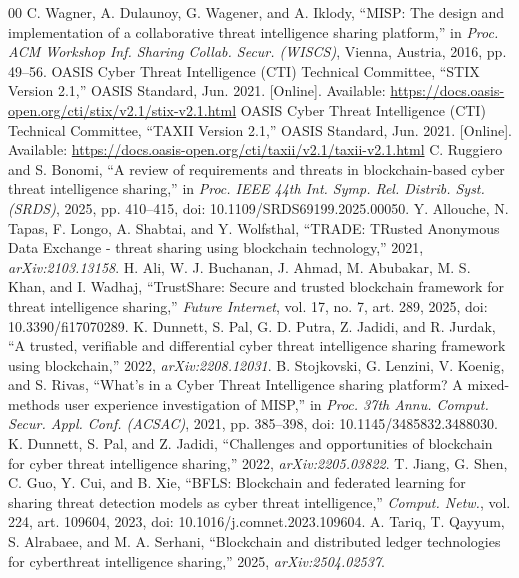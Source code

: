 \documentclass[conference]{IEEEtran}
\begin{document}
{\scriptsize\renewcommand{\baselinestretch}{0.80}\selectfont\setlength{\baselineskip}{6.4pt}
\begin{thebibliography}{00}
\setlength{\itemsep}{0pt plus 0.3pt}
 C. Wagner, A. Dulaunoy, G. Wagener, and A. Iklody, ``MISP: The design and implementation of a collaborative threat intelligence sharing platform,'' in \emph{Proc. ACM Workshop Inf. Sharing Collab. Secur. (WISCS)}, Vienna, Austria, 2016, pp. 49--56.
 OASIS Cyber Threat Intelligence (CTI) Technical Committee, ``STIX Version 2.1,'' OASIS Standard, Jun. 2021. [Online]. Available: \url{https://docs.oasis-open.org/cti/stix/v2.1/stix-v2.1.html}
 OASIS Cyber Threat Intelligence (CTI) Technical Committee, ``TAXII Version 2.1,'' OASIS Standard, Jun. 2021. [Online]. Available: \url{https://docs.oasis-open.org/cti/taxii/v2.1/taxii-v2.1.html}
 C. Ruggiero and S. Bonomi, ``A review of requirements and threats in blockchain-based cyber threat intelligence sharing,'' in \emph{Proc. IEEE 44th Int. Symp. Rel. Distrib. Syst. (SRDS)}, 2025, pp. 410--415, doi: 10.1109/SRDS69199.2025.00050.
 Y. Allouche, N. Tapas, F. Longo, A. Shabtai, and Y. Wolfsthal, ``TRADE: TRusted Anonymous Data Exchange - threat sharing using blockchain technology,'' 2021, \emph{arXiv:2103.13158}.
 H. Ali, W. J. Buchanan, J. Ahmad, M. Abubakar, M. S. Khan, and I. Wadhaj, ``TrustShare: Secure and trusted blockchain framework for threat intelligence sharing,'' \emph{Future Internet}, vol. 17, no. 7, art. 289, 2025, doi: 10.3390/fi17070289.
 K. Dunnett, S. Pal, G. D. Putra, Z. Jadidi, and R. Jurdak, ``A trusted, verifiable and differential cyber threat intelligence sharing framework using blockchain,'' 2022, \emph{arXiv:2208.12031}.
 B. Stojkovski, G. Lenzini, V. Koenig, and S. Rivas, ``What's in a Cyber Threat Intelligence sharing platform? A mixed-methods user experience investigation of MISP,'' in \emph{Proc. 37th Annu. Comput. Secur. Appl. Conf. (ACSAC)}, 2021, pp. 385--398, doi: 10.1145/3485832.3488030.
 K. Dunnett, S. Pal, and Z. Jadidi, ``Challenges and opportunities of blockchain for cyber threat intelligence sharing,'' 2022, \emph{arXiv:2205.03822}.
 T. Jiang, G. Shen, C. Guo, Y. Cui, and B. Xie, ``BFLS: Blockchain and federated learning for sharing threat detection models as cyber threat intelligence,'' \emph{Comput. Netw.}, vol. 224, art. 109604, 2023, doi: 10.1016/j.comnet.2023.109604.
 A. Tariq, T. Qayyum, S. Alrabaee, and M. A. Serhani, ``Blockchain and distributed ledger technologies for cyberthreat intelligence sharing,'' 2025, \emph{arXiv:2504.02537}.

\end{thebibliography}}
\end{document}
